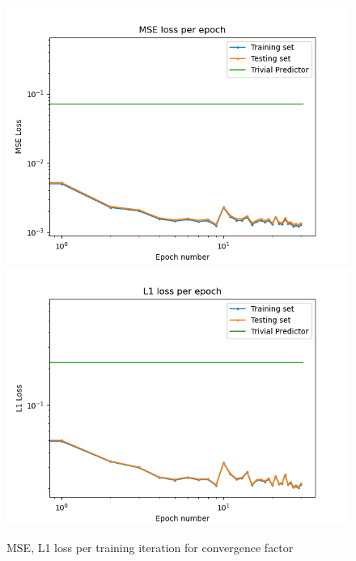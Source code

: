 \begin{figure}[h]
  \centering
  \includegraphics[scale=0.7]{figures/jacobi-conv/conv_mse.png}
  \includegraphics[scale=0.7]{figures/jacobi-conv/conv_l1.png}
  \caption{MSE, L1 loss per training iteration for convergence factor}
  \label{fig:conv_loss}
\end{figure}

